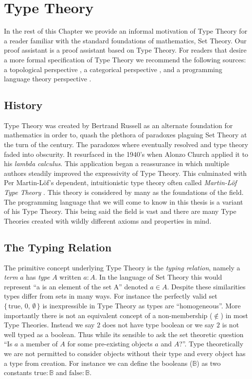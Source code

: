 \documentclass[./Thesis.tex]{subfiles}
\begin{document}
\section{Type Theory}
In the rest of this Chapter we provide an informal motivation of Type Theory for a reader
familiar with the standard foundations of mathematics, Set Theory. Our proof
assistant \Agda{} is a proof assistant based on Type Theory. For readers that
desire a more formal specification of Type Theory we recommend the following
sources: a topological perspective \cite{hott-book}, a categorical perspective
\cite{nlab}, and a programming language theory perspective \cite{harper}.
\subsection{History}
\label{sec:history}
Type Theory was created by Bertrand Russell as an alternate foundation for
mathematics in order to, quash the plethora of
paradoxes plaguing Set Theory at the turn of the century. The paradoxes
where eventually resolved and type theory faded into obscurity. It resurfaced in
the 1940's when Alonzo Church applied it to his \textit{lambda calculus}. This
application began a reassurance in which multiple authors steadily improved the
expressivity of Type Theory. This culminated with Per Martin-L\"{o}f's
dependent, intuitionistic type theory often called
\textit{Martin-L\"{o}f Type Theory} \cite{martin-lof}.
This theory is considered by many as the foundations of the field. The
programming language \Agda{} that we will come to know in this thesis is a
variant of his Type Theory. This being said the field is vast and there are many
Type Theories created with wildly different axioms and properties in mind.
\subsection{The Typing Relation}
\label{sec:typing-relation}
The primitive concept underlying Type Theory is the \textit{typing relation},
namely a \textit{term} $a$ has \textit{type} $A$ written $a : A$. In the
language of Set Theory this would represent ``a is an element of the set A''
denoted $a \in A$. Despite these similarities types differ from sets in many
ways. For instance the perfectly valid set
$\{ \, \text{true}, \, 0, \, \emptyset \, \}$
is inexpressible in Type Theory as types are ``homogeneous''. More importantly
there is not an equivalent concept of a non-membership ($\notin$) in most Type
Theories. Instead we say $2$ does not have type boolean or we say $2$ is not
well typed as a boolean. Thus while its sensible to ask the set theoretic question
``Is $a$ a member of $A$ for some pre-existing objects $a$ and $A$?''. Type
theoretically we are not permitted to consider objects without their type and
every object has a type from creation. For instance we can define the booleans
($𝔹$) as two constants $\text{true} : 𝔹$ and $\text{false} : 𝔹$.
\end{document}
